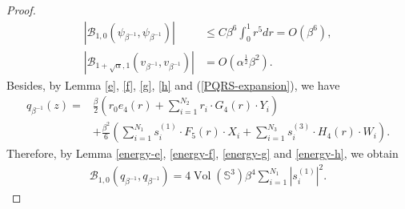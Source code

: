 \documentclass[11pt,letterpaper]{amsart}
\DeclareMathOperator{\Vol}{Vol}
\newcommand{\mB}{\mathcal{B}}
\newcommand{\bS}{\mathbb{S}}
\theoremstyle{definition}
\theoremstyle{remark}
\numberwithin{equation}{section}
\begin{document}
\begin{proof}
\begin{equation}
\begin{split}
        |\mB_{1, 0}(\psi_{\beta^{-1}},\psi_{\beta^{-1}})|&\leq C\beta^6\int_{0}^{1} r^5dr=O(\beta^6),\\
        |\mB_{1+\sqrt{\alpha}, 1}(v_{\beta^{-1}},v_{\beta^{-1}})|&=O(\alpha^{\frac{1}{2}}\beta^2).
    \end{split}
\end{equation}
Besides, by Lemma \ref{e}, \ref{f}, \ref{g}, \ref{h} and (\ref{PQRS-expansion}), we have
\begin{equation*}
\begin{split}
    q_{\beta^{-1}}(z)=&\frac{\beta}{2}\left(r_0e_4(r)+\sum_{i=1}^{N_2}r_i\cdot G_4(r)\cdot Y_i\right)\\
    &+\frac{\beta^2}{6} \left(\sum_{i=1}^{N_1} s^{(1)}_i\cdot F_5(r)\cdot X_i+\sum_{i=1}^{N_3}s^{(3)}_i\cdot H_4(r)\cdot W_i\right).
    \end{split}
\end{equation*}
Therefore, by Lemma \ref{energy-e}, \ref{energy-f}, \ref{energy-g} and \ref{energy-h}, we obtain
\begin{equation}
\begin{split}
    \mB_{1, 0}(q_{\beta^{-1}},q_{\beta^{-1}})=4\Vol(\bS^3)\beta^4 \sum_{i=1}^{N_1} |s^{(1)}_i|^2.
    \end{split}
\end{equation}
\end{proof}
\end{document}
